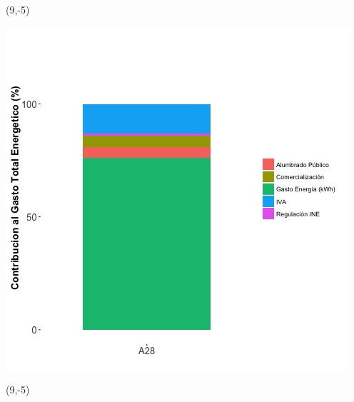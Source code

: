 \documentclass{article}\usepackage[]{graphicx}\usepackage[]{color}
\newenvironment{knitrout}{}{} %
\begin{document}
 \begin{textblock}{1}(9,-5)
\begin{minipage}{20em}
\begingroup

\endgroup
\end{minipage}
\end{textblock}

\begin{knitrout}
\color{fgcolor}
\includegraphics[scale=0.65]{figure/A28_costvars_plot.jpg} 
\end{knitrout}

 \begin{textblock}{1}(9,-5)
\begin{minipage}{20em}
\begingroup

\endgroup
\end{minipage}
\end{textblock}
\end{document}
